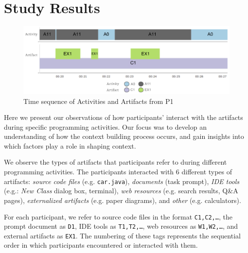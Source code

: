 
\section{Study Results}



\begin{figure}
\includegraphics[width=\columnwidth]{figures/P1timeplot}
\caption{Time sequence of Activities and Artifacts from P1}
\label{P1Fig}
\end{figure}

Here we present our observations of how participants' interact with the artifacts during specific programming activities. Our focus was to develop an understanding of how the context building process occurs, and gain insights into which factors play a role in shaping context.


We observe the types of artifacts that participants refer to during different programming activities. The participants interacted with 6 different types of artifacts: \textit{source code files} (e.g. \texttt{car.java}), \textit{documents} (task prompt), \textit{IDE tools} (e.g.: \textit{New Class} dialog box, terminal), \textit{web resources} (e.g. search results, Q\&A pages), \textit{externalized artifacts} (e.g. paper diagrams), and \textit{other} (e.g. calculators).

For each participant, we refer to source code files in the format \texttt{C1,C2,\ldots}, the prompt document as \texttt{D1}, IDE tools as \texttt{T1,T2,\ldots}, web resources as \texttt{W1,W2,\ldots}, and external artifacts as \texttt{EX1}. The numbering of these tags represents the sequential order in which participants encountered or interacted with them.


